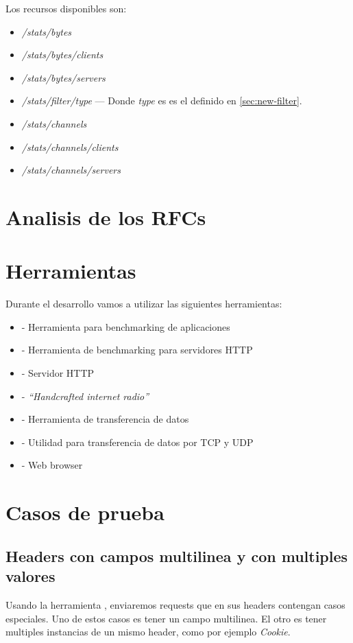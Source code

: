 \documentclass[11pt,a4paper,titlepage]{article}
\begin{document}
Los recursos disponibles son:
\begin{itemize}
    \item \textit{/stats/bytes}
    \item \textit{/stats/bytes/clients}
    \item \textit{/stats/bytes/servers}
    \item \textit{/stats/filter/type} --- Donde \textit{type} es es el definido en \ref{sec:new-filter}.
    \item \textit{/stats/channels}
    \item \textit{/stats/channels/clients}
    \item \textit{/stats/channels/servers}
\end{itemize}

\section{Analisis de los RFCs}

\section{Herramientas}
    Durante el desarrollo vamos a utilizar las siguientes herramientas:
    \begin{itemize}
        \item {} - Herramienta para benchmarking de aplicaciones
        \item {} - Herramienta de benchmarking para servidores HTTP
        \item {} - Servidor HTTP
        \item {} - \emph{``Handcrafted internet radio''}
        \item {} - Herramienta de transferencia de datos
        \item {} - Utilidad para transferencia de datos por TCP y UDP
        \item {} - Web browser
    \end{itemize}

\section{Casos de prueba}
\subsection{Headers con campos multilinea y con multiples valores}
Usando la herramienta , enviaremos requests que en sus headers contengan casos especiales.
Uno de estos casos es tener un campo multilinea.
El otro es tener multiples instancias de un mismo header, como por ejemplo \textit{Cookie}.
\end{document}
